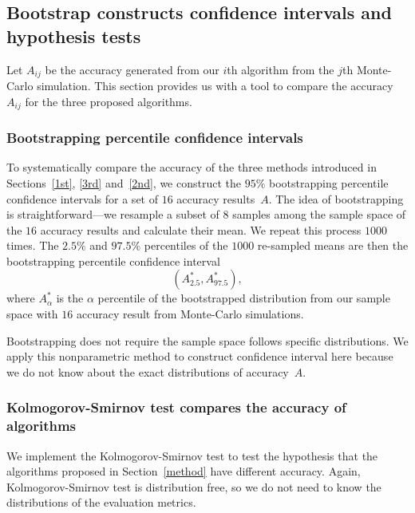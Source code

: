 \documentclass[12pt]{article} %
\begin{document}
\subsection{Bootstrap constructs confidence intervals and hypothesis tests}
Let $A_{ij}$ be the accuracy generated from our {$i$}th algorithm from the $j$th Monte-Carlo simulation. This section provides us with a tool to compare the accuracy~$A_{ij}$ for the three proposed algorithms.
\subsubsection{Bootstrapping percentile confidence intervals}\label{ci}
To systematically compare the accuracy of the three methods introduced in Sections~\ref{1st}, \ref{3rd} and~\ref{2nd}, we construct the $95\%$ bootstrapping percentile confidence intervals for a set of $16$ accuracy results~$A$. The idea of bootstrapping  is straightforward---we resample a subset of $8$ samples among the sample space of the $16$ accuracy results and calculate their mean. We repeat this process $1000$ times. The $2.5\%$ and $97.5\%$ percentiles of the $1000$ re-sampled means are then the bootstrapping percentile confidence interval
\begin{equation}
({A}^*_{2.5}, {A}^*_{97.5}), \label{eq:boot}
\end{equation}
where $A^*_{\alpha}$ is the $\alpha$ percentile of the bootstrapped distribution from our sample space with $16$ accuracy result from Monte-Carlo simulations.

Bootstrapping does not require the sample space follows specific distributions. We apply this nonparametric method to construct confidence interval here because we do not know about the exact distributions of accuracy~$A$.

\subsubsection{Kolmogorov-Smirnov test compares the accuracy of algorithms}\label{sec:ks}
We implement the Kolmogorov-Smirnov test to test the hypothesis that the algorithms proposed in Section~\ref{method} have different accuracy.  Again, Kolmogorov-Smirnov test is distribution free, so we do not need to know the distributions of the evaluation metrics.
\end{document}

